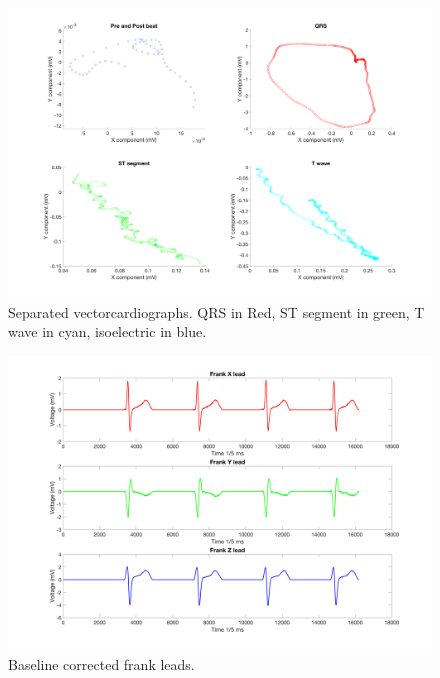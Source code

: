 \documentclass[12pt]{article}
\begin{document}
\begin{figure}[H]
	
	\centering
	\includegraphics[width = .95\textwidth]{Figures/LimLeads5.png}
	\caption{Separated vectorcardiographs. QRS in Red, ST segment in green, T wave in cyan, isoelectric in blue. }
	\label{fig:Limb5}
\end{figure}

\begin{figure}[H]
	
	\centering
	\includegraphics[width = .95\textwidth]{Figures/FrankLeads1.png}
	\caption{ Baseline corrected frank leads. }
	\label{fig:Frank1}
\end{figure}
\end{document}
